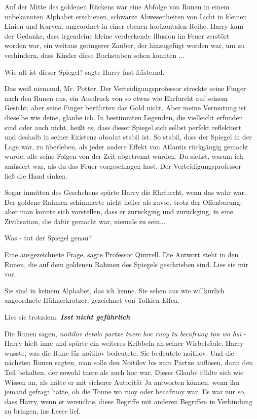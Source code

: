 Auf der Mitte des goldenen Rückens war eine Abfolge von Runen in einem
unbekannten Alphabet erschienen, schwarze Abwesenheiten von Licht in kleinen
Linien und Kurven, angeordnet in einer ebenen horizontalen Reihe. Harry kam der
Gedanke, dass irgendeine kleine verdeckende Illusion im Feuer zerstört worden
war, ein weitaus geringerer Zauber, der hinzugefügt worden war, um zu
verhindern, dass Kinder diese Buchstaben sehen konnten ...

\glqq{}Wie alt ist dieser Spiegel?\grqq{} sagte Harry fast flüsternd.

\glqq{}Das weiß niemand, Mr. Potter.\grqq{} Der Verteidigungsprofessor streckte
seine Finger nach den Runen aus, ein Ausdruck von so etwas wie Ehrfurcht auf
seinem Gesicht; aber seine Finger berührten das Gold nicht. \glqq{}Aber meine
Vermutung ist dieselbe wie deine, glaube ich. In bestimmten Legenden, die
vielleicht erfunden sind oder auch nicht, heißt es, dass dieser Spiegel sich
selbst perfekt reflektiert und deshalb in seiner Existenz absolut stabil ist. So
stabil, dass der Spiegel in der Lage war, zu überleben, als jeder andere Effekt
von Atlantis rückgängig gemacht wurde, alle seine Folgen von der Zeit abgetrennt
wurden. Du siehst, warum ich amüsiert war, als du das Feuer vorgeschlagen
hast.\grqq{} Der Verteidigungsprofessor ließ die Hand sinken.

Sogar inmitten des Geschehens spürte Harry die Ehrfurcht, wenn das wahr war. Der
goldene Rahmen schimmerte nicht heller als zuvor, trotz der Offenbarung; aber
man konnte sich vorstellen, dass er zurückging und zurückging, in eine
Zivilisation, die dafür gemacht war, niemals zu sein...

\glqq{}Was - tut der Spiegel genau?\grqq{}

\glqq{}Eine ausgezeichnete Frage\grqq{}, sagte Professor Quirrell. \glqq{}Die
Antwort steht in den Runen, die auf dem goldenen Rahmen des Spiegels geschrieben
sind. Lies sie mir vor.\grqq{}

\glqq{}Sie sind in keinem Alphabet, das ich kenne. Sie sehen aus wie willkürlich
angeordnete Hühnerkratzer, gezeichnet von Tolkien-Elfen.\grqq{}

\glqq{}Lies sie trotzdem.\textbf{\emph{ Isst nicht gefährlich}}.\grqq{}

\glqq{}Die Runen sagen, \emph{noitilov detalo partxe tnere hoc ruoy tu becafruoy
ton wo hsi} -\grqq{} Harry hielt inne und spürte ein weiteres Kribbeln an seiner
Wirbelsäule. Harry wusste, was die Rune für noitilov bedeutete. Sie bedeutete
noitilov. Und die nächsten Runen sagten, man solle den Noitilov bis zum Partxe
auflösen, dann den Teil behalten, der sowohl tnere als auch hoc war. Dieser
Glaube fühlte sich wie Wissen an, als hätte er mit sicherer Autorität \glqq
Ja\grqq{} antworten können, wenn ihn jemand gefragt hätte, ob die Tonne wo ruoy
oder becafruoy war. Es war nur so, dass Harry, wenn er versuchte, diese Begriffe
mit anderen Begriffen in Verbindung zu bringen, ins Leere lief.

